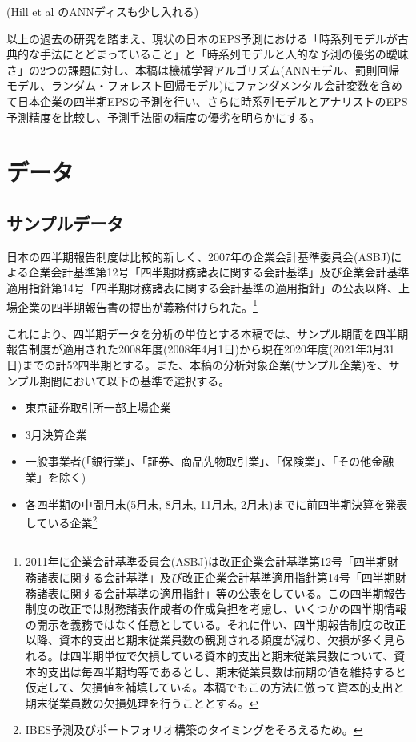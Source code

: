 \documentclass[a4paper, 12pt]{jsreport}
\begin{document}
(Hill et al のANNディスも少し入れる)

以上の過去の研究を踏まえ、現状の日本のEPS予測における「時系列モデルが古典的な手法にとどまっていること」と「時系列モデルと人的な予測の優劣の曖昧さ」の2つの課題に対し、本稿は機械学習アルゴリズム(ANNモデル、罰則回帰モデル、ランダム・フォレスト回帰モデル)にファンダメンタル会計変数を含めて日本企業の四半期EPSの予測を行い、さらに時系列モデルとアナリストのEPS予測精度を比較し、予測手法間の精度の優劣を明らかにする。

\chapter{データ}

\section{サンプルデータ}

日本の四半期報告制度は比較的新しく、2007年の企業会計基準委員会(ASBJ)による企業会計基準第12号「四半期財務諸表に関する会計基準」及び企業会計基準適用指針第14号「四半期財務諸表に関する会計基準の適用指針」の公表以降、上場企業の四半期報告書の提出が義務付けられた。\footnote{2011年に企業会計基準委員会(ASBJ)は改正企業会計基準第12号「四半期財務諸表に関する会計基準」及び改正企業会計基準適用指針第14号「四半期財務諸表に関する会計基準の適用指針」等の公表をしている。この四半期報告制度の改正では財務諸表作成者の作成負担を考慮し、いくつかの四半期情報の開示を義務ではなく任意としている。それに伴い、四半期報告制度の改正以降、資本的支出と期末従業員数の観測される頻度が減り、欠損が多く見られる。\cite{zhang2004neural}は四半期単位で欠損している資本的支出と期末従業員数について、資本的支出は毎四半期均等であるとし、期末従業員数は前期の値を維持すると仮定して、欠損値を補填している。本稿でもこの方法に倣って資本的支出と期末従業員数の欠損処理を行うこととする。}

これにより、四半期データを分析の単位とする本稿では、サンプル期間を四半期報告制度が適用された2008年度(2008年4月1日)から現在2020年度(2021年3月31日)までの計52四半期とする。また、本稿の分析対象企業(サンプル企業)を、サンプル期間において以下の基準で選択する。

\begin{itemize}
  \item 東京証券取引所一部上場企業
  \item 3月決算企業
  \item 一般事業者(「銀行業」、「証券、商品先物取引業」、「保険業」、「その他金融業」を除く)
  \item 各四半期の中間月末(5月末, 8月末, 11月末, 2月末)までに前四半期決算を発表している企業\footnote{IBES予測及びポートフォリオ構築のタイミングをそろえるため。}
\end{itemize}
\end{document}
